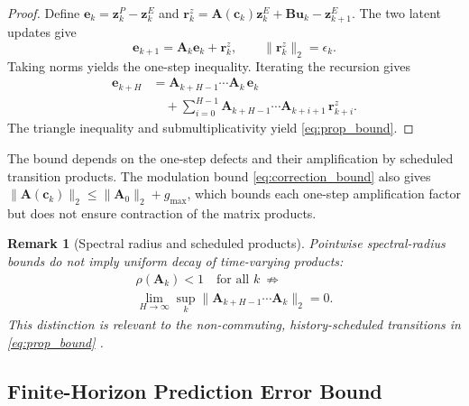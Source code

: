 \documentclass[journal]{IEEEtran}
\newtheorem{remark}{Remark}
\newcommand{\vu}{\mathbf{u}}
\newcommand{\vz}{\mathbf{z}}
\newcommand{\vr}{\mathbf{r}}
\newcommand{\ve}{\mathbf{e}}
\newcommand{\mA}{\mathbf{A}}
\newcommand{\mB}{\mathbf{B}}
\newcommand{\vc}{\mathbf{c}}
\begin{document}
\begin{proof}
Define \(\ve_k=\vz^P_k-\vz^E_k\) and
\(\vr^z_k=\mA(\vc_k)\vz^E_k+\mB\vu_k-\vz^E_{k+1}\).
The two latent updates give
\begin{equation*}
    \ve_{k+1}=\mA_k\ve_k+\vr^z_k,
    \qquad \|\vr^z_k\|_2=\epsilon_k.
\end{equation*}
Taking norms yields the one-step inequality. Iterating the recursion gives
\begin{align*}
    \ve_{k+H}
    &=\mA_{k+H-1}\cdots\mA_{k}\,\ve_k \\
    &\quad+\sum_{i=0}^{H-1}\mA_{k+H-1}\cdots\mA_{k+i+1}\,\vr^{z}_{k+i}.
\end{align*}
The triangle inequality and submultiplicativity yield \eqref{eq:prop_bound}.
\end{proof}

The bound depends on the one-step defects and their amplification by scheduled transition products. The modulation bound \eqref{eq:correction_bound} also gives \(\|\mA(\vc_k)\|_2\le\|\mA_0\|_2+g_{\max}\), which bounds each one-step amplification factor but does not ensure contraction of the matrix products.

\begin{remark}[Spectral radius and scheduled products]
\label{rem:spectral}
Pointwise spectral-radius bounds do not imply uniform decay of time-varying products:
\begin{equation}
    \begin{gathered}
        \rho(\mA_k)<1\quad \text{for all }k
        \ \not\Longrightarrow \\[1pt]
        \lim_{H\to\infty}\sup_k
        \big\|\mA_{k+H-1}\cdots\mA_k\big\|_2=0.
    \end{gathered}
\end{equation}
This distinction is relevant to the non-commuting, history-scheduled transitions in \eqref{eq:prop_bound} \cite{daubechies1992sets, rota1960joint, jungers2009joint}.
\end{remark}

\subsection{Finite-Horizon Prediction Error Bound}
\label{subsec:fh_bound}
\end{document}
